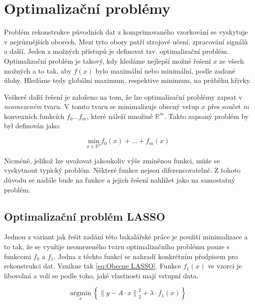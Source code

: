 \documentclass[FM,BP]{tulthesis}
\newcounter{Vzorce}
\begin{document}
\chapter{Optimalizační problémy}
\label{ch:optproblem}
Problém rekonstrukce původních dat z komprimovaného vzorkování se vyskytuje v nejrůznějších oborech.  Mezi tyto obory patří strojové učení, zpracování signálů a další. Jeden z možných přístupů je definovat tzv. optimalizační problém. Optimalizační problém je takový, kdy hledáme nejlepší možné řešení $x$ ze všech možných a to tak, aby $f(x)$ bylo maximální nebo minimální, podle zadané úlohy. Hledáme tedy globální maximum, respektive minimum, na průběhu křivky. 


Veškeré další řešení je založeno na tom, že lze optimalizační problémy zapsat v \textit{neomezeném} tvaru. V tomto tvaru se minimalizuje obecný vstup $x$ přes součet $m$ konvexních funkcích $f_0 \ldots f_m$, které náleží množině $\mathbb{R}^m$. Takto zapsaný problém by byl definován jako:

\begin{equation} \label{eq:Obecny problem} \tag{Vzorec \theVzorce}
\underset{x \in \mathbb{R}^n} {\mathrm{min}} f_{0}(x)+\ldots+f_{m}(x)
\end{equation}

Nicméně, jelikož lze uvažovat jakoukoliv výše zmíněnou funkci, může se vyskytnout typický problém. Některé funkce nejsou diferencovatelné. Z tohoto důvodu se nadále bude na funkce a jejich řešení nahlížet jako na samostatný problém.

\section{Optimalizační problém LASSO}
\label{subch:optLASSO}
Jednou z variant jak řešit zadání této bakalářské práce je použití minimalizace a to tak, že se využije neomezeného tvaru optimalizačního problému pouze s funkcemi $f_0$ a $f_1$. Jedna z těchto funkcí se nahradí konkrétním předpisem pro rekonstrukci dat. Vznikne tak \ref{eq:Obecne LASSO}. Funkce $f_1(x)$ ve vzorci je libovolná a volí se podle toho, jaké vlastnosti mají vstupní data. 

\begin{equation} \label{eq:Obecne LASSO} \tag{Vzorec \theVzorce}
\underset{x} {\mathrm{argmin}} ~\left\{\left\|y-A \cdot x\right\| ^2 _2+ \lambda \cdot f_1(x)\right\}
\end{equation}
\end{document}
